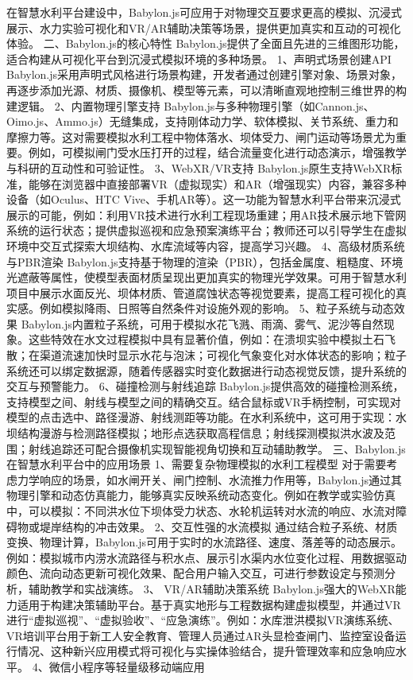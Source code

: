 在智慧水利平台建设中，Babylon.js可应用于对物理交互要求更高的模拟、沉浸式展示、水力实验可视化和VR/AR辅助决策等场景，提供更加真实和互动的可视化体验。 二、Babylon.js的核心特性 Babylon.js提供了全面且先进的三维图形功能，适合构建从可视化平台到沉浸式模拟环境的多种场景。 1、声明式场景创建API Babylon.js采用声明式风格进行场景构建，开发者通过创建引擎对象、场景对象，再逐步添加光源、材质、摄像机、模型等元素，可以清晰直观地控制三维世界的构建逻辑。 2、内置物理引擎支持 Babylon.js与多种物理引擎（如Cannon.js、Oimo.js、Ammo.js）无缝集成，支持刚体动力学、软体模拟、关节系统、重力和摩擦力等。这对需要模拟水利工程中物体落水、坝体受力、闸门运动等场景尤为重要。例如，可模拟闸门受水压打开的过程，结合流量变化进行动态演示，增强教学与科研的互动性和可验证性。 3、WebXR/VR支持 Babylon.js原生支持WebXR标准，能够在浏览器中直接部署VR（虚拟现实）和AR（增强现实）内容，兼容多种设备（如Oculus、HTC Vive、手机AR等）。这一功能为智慧水利平台带来沉浸式展示的可能，例如：利用VR技术进行水利工程现场重建；用AR技术展示地下管网系统的运行状态；提供虚拟巡视和应急预案演练平台；教师还可以引导学生在虚拟环境中交互式探索大坝结构、水库流域等内容，提高学习兴趣。 4、高级材质系统与PBR渲染 Babylon.js支持基于物理的渲染（PBR），包括金属度、粗糙度、环境光遮蔽等属性，使模型表面材质呈现出更加真实的物理光学效果。可用于智慧水利项目中展示水面反光、坝体材质、管道腐蚀状态等视觉要素，提高工程可视化的真实感。例如模拟降雨、日照等自然条件对设施外观的影响。 5、粒子系统与动态效果 Babylon.js内置粒子系统，可用于模拟水花飞溅、雨滴、雾气、泥沙等自然现象。这些特效在水文过程模拟中具有显著价值，例如：在溃坝实验中模拟土石飞散；在渠道流速加快时显示水花与泡沫；可视化气象变化对水体状态的影响；粒子系统还可以绑定数据源，随着传感器实时变化数据进行动态视觉反馈，提升系统的交互与预警能力。 6、碰撞检测与射线追踪 Babylon.js提供高效的碰撞检测系统，支持模型之间、射线与模型之间的精确交互。结合鼠标或VR手柄控制，可实现对模型的点击选中、路径漫游、射线测距等功能。在水利系统中，这可用于实现：水坝结构漫游与检测路径模拟；地形点选获取高程信息；射线探测模拟洪水波及范围；射线追踪还可配合摄像机实现智能视角切换和互动辅助教学。 三、Babylon.js在智慧水利平台中的应用场景 1、需要复杂物理模拟的水利工程模型 对于需要考虑力学响应的场景，如水闸开关、闸门控制、水流推力作用等，Babylon.js通过其物理引擎和动态仿真能力，能够真实反映系统动态变化。例如在教学或实验仿真中，可以模拟：不同洪水位下坝体受力状态、水轮机运转对水流的响应、水流对障碍物或堤岸结构的冲击效果。 2、交互性强的水流模拟 通过结合粒子系统、材质变换、物理计算，Babylon.js可用于实时的水流路径、速度、落差等的动态展示。例如：模拟城市内涝水流路径与积水点、展示引水渠内水位变化过程、用数据驱动颜色、流向动态更新可视化效果、配合用户输入交互，可进行参数设定与预测分析，辅助教学和实战演练。 3、 VR/AR辅助决策系统 Babylon.js强大的WebXR能力适用于构建决策辅助平台。基于真实地形与工程数据构建虚拟模型，并通过VR进行``虚拟巡视''、``虚拟验收''、``应急演练''。例如：水库泄洪模拟VR演练系统、VR培训平台用于新工人安全教育、管理人员通过AR头显检查闸门、监控室设备运行情况、这种新兴应用模式将可视化与实操体验结合，提升管理效率和应急响应水平。 4、微信小程序等轻量级移动端应用 